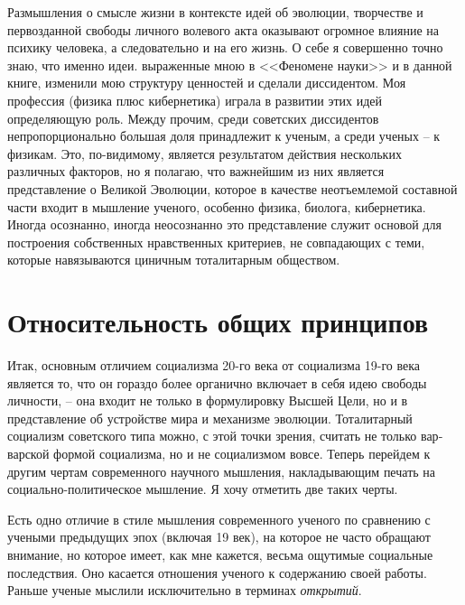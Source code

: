 \documentclass{book}
\begin{document}
Размышления о смысле жизни в контексте идей об эволюции, творчестве и первозданной свободы личного волевого акта оказывают огромное влияние на психику человека, а следо­вательно и на его жизнь. О себе я совершенно точно знаю, что именно идеи. выраженные мною в <<Феномене науки>> и в данной книге, изменили мою структуру ценностей и сделали диссиден­том. Моя профессия (физика плюс кибернетика) играла в раз­витии этих идей определяющую роль. Между прочим, среди советских диссидентов непропорционально большая доля при­надлежит к ученым, а среди ученых -- к физикам. Это, по-видимому, является результатом действия нескольких различных факторов, но я полагаю, что важнейшим из них является представление о Великой Эволюции, которое в качестве неотъемлемой составной части входит в мышление ученого, особенно физика, биолога, кибернетика. Иногда осознанно, иногда неосоз­нанно это представление служит основой для построения собственных нравственных критериев, не совпадающих с теми, которые навязываются циничным 
тоталитарным обществом.


\section{Относительность общих принципов}

Итак, основным отличием социализма 20-го века от социа­лизма 19-го века является то, что он гораздо более органично включает в себя идею свободы личности, -- она входит не только в формулировку Высшей Цели, но и в представление об устрой­стве мира и механизме эволюции. Тоталитарный социализм со­ветского типа можно, с этой точки зрения, считать не только вар­варской формой социализма, но и не социализмом вовсе. Теперь перейдем к другим чертам современного научного мышления, накладывающим печать на социально-политическое мышление. Я хочу отметить две таких черты.

Есть одно отличие в стиле мышления современного ученого по сравнению с учеными предыдущих эпох (включая 19 век), на которое не часто обращают внимание, но которое имеет, как мне кажется, весьма ощутимые социальные последствия. Оно касается отношения ученого к содержанию своей работы. Раньше ученые мыслили исключительно в терминах \textit{открытий}. 
\end{document}
